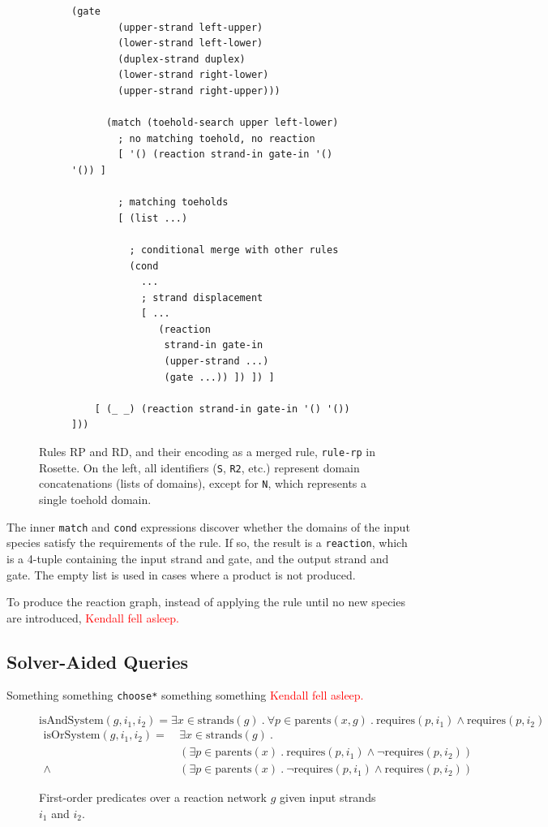 \documentclass{article}
\begin{document}
\begin{figure}
\begin{subfigure}[c]{0.5\textwidth}
\begin{lstlisting}[basicstyle=\footnotesize\ttfamily]
       (gate
        (upper-strand left-upper)
        (lower-strand left-lower)
        (duplex-strand duplex)
        (lower-strand right-lower)
        (upper-strand right-upper)))

      (match (toehold-search upper left-lower)
        ; no matching toehold, no reaction
        [ '() (reaction strand-in gate-in '() '()) ]

        ; matching toeholds
        [ (list ...)

          ; conditional merge with other rules
          (cond
            ...
            ; strand displacement
            [ ...
               (reaction
                strand-in gate-in
                (upper-strand ...)
                (gate ...)) ]) ]) ]

    [ (_ _) (reaction strand-in gate-in '() '()) ]))
\end{lstlisting}
\end{subfigure}
\caption{
Rules RP and RD, and their encoding as a merged rule, \lstinline{rule-rp} in
Rosette.  On the left, all identifiers (\lstinline{S}, \lstinline{R2}, etc.)
represent domain concatenations (lists of domains), except for \lstinline{N},
which represents a single toehold domain.
}
\label{figure:example-rule}
\end{figure}

The inner \verb;match; and \verb;cond;
expressions discover whether the domains of the input species satisfy
the requirements of the rule. If so, the result is a \verb;reaction;,
which is a 4-tuple containing the input strand and gate, and the
output strand and gate. The empty list is used in
cases where a product is not produced.

To produce the reaction graph, instead of applying the rule until
no new species are introduced, \textcolor{red}{Kendall fell asleep.}

\subsection{Solver-Aided Queries}

Something something \verb;choose*; something something \textcolor{red}
{Kendall fell asleep.}

\begin{figure}
\[\mathrm{isAndSystem}(g, i_1, i_2) =
\exists x \in \mathrm{strands}(g)\ .\ 
\forall p \in \mathrm{parents}(x, g)\ .\ 
\mathrm{requires}(p, i_1) \land \mathrm{requires}(p, i_2)\]
\begin{align*}
\mathrm{isOrSystem}(g, i_1, i_2) = & \ 
\exists x \in \mathrm{strands}(g)\ .
\\
& \ (\exists p \in \mathrm{parents}(x)\ .\ 
\mathrm{requires}(p, i_1) \land \lnot \mathrm{requires}(p, i_2))
\\
\land & \ 
(\exists p \in \mathrm{parents}(x)\ .\ 
\lnot \mathrm{requires}(p, i_1) \land \mathrm{requires}(p, i_2))
\end{align*}
\caption{
First-order predicates over a reaction network
$g$ given input strands $i_1$ and $i_2$.
}
\end{figure}
\end{document}
